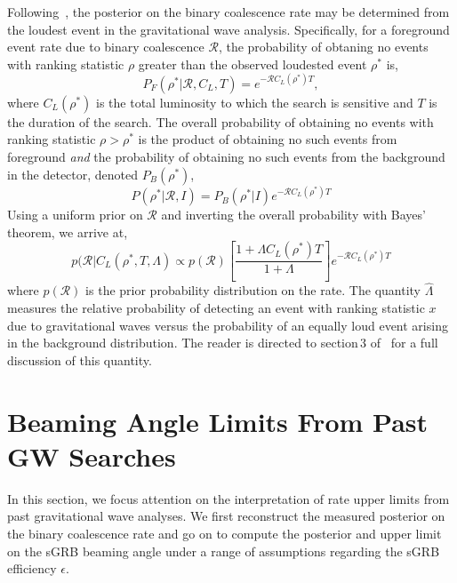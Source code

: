 \documentclass[nofootinbib]{revtex4}
\newcommand{\gw}{gravitational wave }
\newcommand{\gws}{gravitational waves }
\newcommand{\cbcrate}{{{\mathcal R}}}
\newcommand{\rhostar}{{\rho^*}}
\begin{document}
Following~\cite{Biswas09,BradyFairhurst08}, the posterior on the binary
coalescence rate may be determined from the loudest event in the \gw
analysis.  Specifically, for a foreground event rate due to  binary coalescence
$\cbcrate$, the probability of obtaning no events with ranking statistic $\rho$
greater than the observed loudested event $\rhostar$ is,
%
\begin{equation}
P_F(\rhostar | \cbcrate, C_L, T) = e^{-\cbcrate C_L(\rhostar) T},
\end{equation}
%
where $C_L(\rhostar)$ is the total luminosity to which the search is sensitive
and $T$ is the duration of the search.  The overall probability of obtaining
no events with ranking statistic $\rho>\rhostar$ is the product of obtaining
no such events from foreground \emph{and} the probability of obtaining no such
events from the background in the detector, denoted $P_B(\rhostar)$,
%
\begin{equation}
P(\rhostar|\cbcrate,I) = P_B(\rhostar|I)e^{-\cbcrate C_L(\rhostar) T}
\end{equation}
%
Using a uniform prior on $\cbcrate$ and inverting the overall probability with
Bayes' theorem, we arrive at,
%
\begin{equation}\label{eq:loudestEventPosterior}
p(\cbcrate | C_L({\rhostar}, T, \Lambda) \propto p(\cbcrate) \left[ \frac{1+\Lambda
C_L(\rhostar) T}{1+\Lambda}\right] e^{-\cbcrate C_L(\rhostar) T}
\end{equation}
%
where $p(\cbcrate)$ is the prior probability distribution on the rate.  The
quantity $\hat{\Lambda}$ measures the relative probability of detecting an event
with ranking statistic $x$ due to \gws versus the probability of an equally loud
event arising in the background distribution.  The reader is directed to
section\,3 of~\cite{BradyFairhurst08} for a full discussion of this quantity.

%

\section{Beaming Angle Limits From Past GW Searches}

In this section, we focus attention on the interpretation of rate upper limits
from past \gw analyses.  We first reconstruct the measured posterior on the
binary coalescence rate and go on to compute the posterior and upper limit on
the sGRB beaming angle under a range of assumptions regarding the sGRB
efficiency $\epsilon$.
\end{document}
